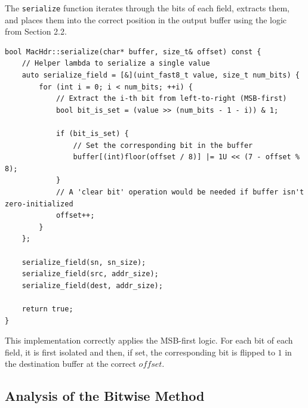 \documentclass{article}
\begin{document}
The \texttt{serialize} function iterates through the bits of each field, extracts them, and places them into the correct position in the output buffer using the logic from Section 2.2.

\begin{center}
\begin{verbatim}
bool MacHdr::serialize(char* buffer, size_t& offset) const {
    // Helper lambda to serialize a single value
    auto serialize_field = [&](uint_fast8_t value, size_t num_bits) {
        for (int i = 0; i < num_bits; ++i) {
            // Extract the i-th bit from left-to-right (MSB-first)
            bool bit_is_set = (value >> (num_bits - 1 - i)) & 1;

            if (bit_is_set) {
                // Set the corresponding bit in the buffer
                buffer[(int)floor(offset / 8)] |= 1U << (7 - offset % 8);
            }
            // A 'clear bit' operation would be needed if buffer isn't zero-initialized
            offset++;
        }
    };

    serialize_field(sn, sn_size);
    serialize_field(src, addr_size);
    serialize_field(dest, addr_size);

    return true;
}
\end{verbatim}
\end{center}

This implementation correctly applies the MSB-first logic. For each bit of each field, it is first isolated and then, if set, the corresponding bit is flipped to $1$ in the destination buffer at the correct $offset$.

\subsection{Analysis of the Bitwise Method}
\end{document}

